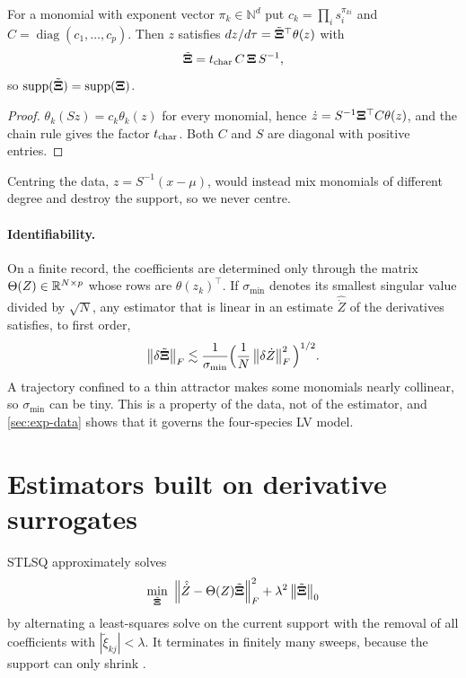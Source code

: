 \begin{lemma}\label{lem:scaling}
For a monomial with exponent vector $\pi_k\in\mathbb N^d$ put $c_k=\prod_i s_i^{\pi_{ki}}$ and $C=\operatorname{diag}(c_1,\dots,c_p)$. Then $z$ satisfies $dz/d\tau=\tilde{\bm{\Xi}}^\top\theta(z)$ with
\begin{equation}
  \tilde{\bm{\Xi}} = t_{\mathrm{char}}\, C\,\bm{\Xi}\,S^{-1},
\end{equation}
so $\operatorname{supp}(\tilde{\bm{\Xi}})=\operatorname{supp}(\bm{\Xi})$.
\end{lemma}
\begin{proof}
$\theta_k(Sz)=c_k\theta_k(z)$ for every monomial, hence $\dot z = S^{-1}\bm{\Xi}^\top C\theta(z)$, and the chain rule gives the factor $t_{\mathrm{char}}$. Both $C$ and $S$ are diagonal with positive entries.
\end{proof}
Centring the data, $z=S^{-1}(x-\mu)$, would instead mix monomials of different degree and destroy the support, so we never centre.

\paragraph{Identifiability.} On a finite record, the coefficients are determined only through the matrix $\Theta(Z)\in\mathbb{R}^{N\times p}$ whose rows are $\theta(z_k)^\top$. If $\sigma_{\min}$ denotes its smallest singular value divided by $\sqrt N$, any estimator that is linear in an estimate $\hat{\dot Z}$ of the derivatives satisfies, to first order,
\begin{equation}\label{eq:ident}
  \left\lVert \delta\tilde{\bm{\Xi}}\right\rVert_F \lesssim \frac{1}{\sigma_{\min}}\Big(\frac{1}{N}\left\lVert \delta\dot Z\right\rVert_F^2\Big)^{1/2}.
\end{equation}
A trajectory confined to a thin attractor makes some monomials nearly collinear, so $\sigma_{\min}$ can be tiny. This is a property of the data, not of the estimator, and \cref{sec:exp-data} shows that it governs the four-species LV model.

\section{Estimators built on derivative surrogates}

STLSQ \parencite{brunton2016sindy} approximately solves
\begin{equation}\label{eq:l0}
  \min_{\tilde{\bm{\Xi}}}\ \left\lVert \hat{\dot Z}-\Theta(Z)\tilde{\bm{\Xi}}\right\rVert_F^2 + \lambda^2\left\lVert \tilde{\bm{\Xi}}\right\rVert_0
\end{equation}
by alternating a least-squares solve on the current support with the removal of all coefficients with $|\tilde\xi_{kj}|<\lambda$. It terminates in finitely many sweeps, because the support can only shrink \parencite{zhang2019convergence}.

